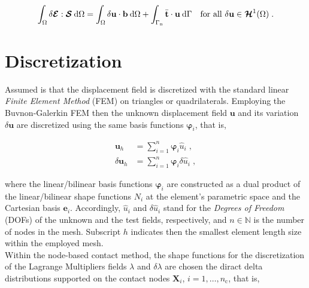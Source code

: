 \documentclass[10pt,a4paper]{article}
\begin{document}
\begin{equation}
	\int_{\Omega} \delta \boldsymbol{\mathcal{E}} : \boldsymbol{\mathcal{S}} \: \text{d} \Omega = \int_{\Omega} \delta \mathbf{u} \cdot \mathbf{b} \: \text{d} \Omega + \int_{\Gamma_{\text{n}}} \bar{\mathbf{t}} \cdot \mathbf{u} \: \text{d} \Gamma \quad \text{for all } \delta \mathbf{u} \in \boldsymbol{\mathcal{H}}^1 (\Omega) \;. \label{eq:variational_formulation_structural_mechanics} \\
\end{equation} 

\section{Discretization}

Assumed is that the displacement field is discretized with the standard linear \textit{Finite Element Method} (FEM) on triangles or quadrilaterals. Employing the Buvnon-Galerkin FEM then the unknown displacement field $\mathbf{u}$ and its variation $\delta \mathbf{u}$ are discretized using the same basis functions $\boldsymbol{\varphi}_i$, that is,

\begin{subequations}
	\begin{alignat}{1}
		\mathbf{u}_h &= \sum_{i = 1}^{n} \boldsymbol{\varphi}_i \hat{u}_i \;, \label{eq:discretization_u} \\
		\delta \mathbf{u}_h &= \sum_{i = 1}^n \boldsymbol{\varphi}_i \delta\hat{u}_i \;, \label{eq:discretization_delta_u}
	\end{alignat}
\end{subequations}

where the linear/bilinear basis functions $\boldsymbol{\varphi}_i$ are constructed as a dual product of the linear/bilinear shape functions $N_i$ at the element's parametric space and the Cartesian basis $\mathbf{e}_i$. Accordingly, $\hat{u}_i$ and $\delta\hat{u}_i$ stand for the \textit{Degrees of Freedom} (DOFs) of the unknown and the test fields, respectively, and $n \in \mathbb{N}$ is the number of nodes in the mesh. Subscript $h$ indicates then the smallest element length size within the employed mesh.\\

Within the node-based contact method, the shape functions for the discretization of the Lagrange Multipliers fields $\lambda$ and $\delta \lambda$ are chosen the diract delta distributions supported on the contact nodes $\mathbf{X}_i$, $i = 1,\ldots,n_{\text{c}}$, that is,
\end{document}
